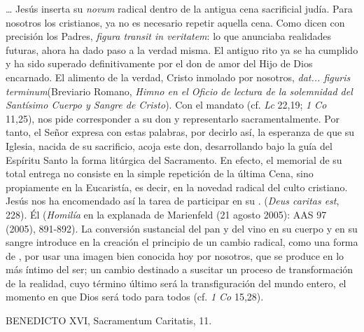 \begin{patercite}
	\ldots{} Jesús inserta su \emph{novum} radical dentro de la antigua cena sacrificial judía. Para nosotros los cristianos, ya no es necesario repetir aquella cena. Como dicen con precisión los Padres, \emph{figura transit in veritatem}: lo que anunciaba realidades futuras, ahora ha dado paso a la verdad misma. El antiguo rito ya se ha cumplido y ha sido superado definitivamente por el don de amor del Hijo de Dios encarnado. El alimento de la verdad, Cristo inmolado por nosotros, \emph{dat... figuris terminum}(Breviario Romano, \emph{Himno en el Oficio de lectura de la solemnidad del Santísimo Cuerpo y Sangre de Cristo}). Con el mandato  (cf. \emph{Lc} 22,19; \emph{1 Co} 11,25), nos pide corresponder a su don y representarlo sacramentalmente. Por tanto, el Señor expresa con estas palabras, por decirlo así, la esperanza de que su Iglesia, nacida de su sacrificio, acoja este don, desarrollando bajo la guía del Espíritu Santo la forma litúrgica del Sacramento. En efecto, el memorial de su total entrega no consiste en la simple repetición de la última Cena, sino propiamente en la Eucaristía, es decir, en la novedad radical del culto cristiano. Jesús nos ha encomendado así la tarea de participar en su . (\emph{Deus caritas est}, 228). Él (\emph{Homilía} en la explanada de Marienfeld (21 agosto 2005): AAS 97 (2005), 891-892). La conversión sustancial del pan y del vino en su cuerpo y en su sangre introduce en la creación el principio de un cambio radical, como una forma de , por usar una imagen bien conocida hoy por nosotros, que se produce en lo más íntimo del ser; un cambio destinado a suscitar un proceso de transformación de la realidad, cuyo término último será la transfiguración del mundo entero, el momento en que Dios será todo para todos (cf. \emph{1 Co} 15,28).
	
	
	BENEDICTO XVI, Sacramentum Caritatis, 11.
\end{patercite}
